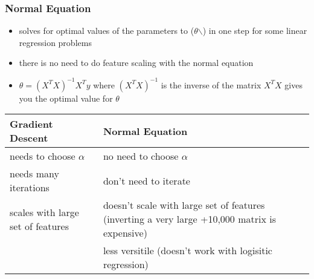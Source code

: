 \documentclass[11pt]{article}
\begin{document}
\subsubsection{Normal Equation}
\label{sec:orge8ebee9}
\begin{itemize}
\item solves for optimal values of the parameters to  \J(\(\theta\)$\backslash$) in one step for some linear regression problems
\item there is no need to do feature scaling with the normal equation
\item \(\theta = (X^{T}X)^{-1}X^{T}y\) where \((X^{T}X)^{-1}\) is the inverse of the matrix \(X^{T}X\) gives you the optimal value for \(\theta\)
\end{itemize}
\begin{center}
\begin{tabular}{ll}
Gradient Descent & Normal Equation\\
\hline
needs to choose \(\alpha\) & no need to choose \(\alpha\)\\
needs many iterations & don't need to iterate\\
scales with large set of features & doesn't scale with large set of features (inverting a very large +10,000 matrix is expensive)\\
 & less versitile (doesn't work with logisitic regression)\\
\end{tabular}
\end{center}
\end{document}

